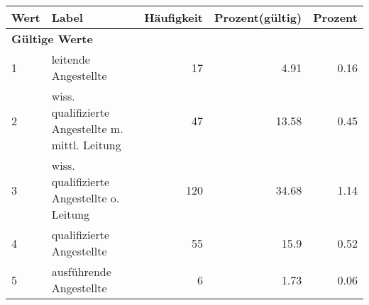      \begin{longtable}{lXrrr}
     \toprule
     \textbf{Wert} & \textbf{Label} & \textbf{Häufigkeit} & \textbf{Prozent(gültig)} & \textbf{Prozent} \\
     \endhead
     \midrule
     \multicolumn{5}{l}{\textbf{Gültige Werte}}\\

     1 &
     \multicolumn{1}{X}{ leitende Angestellte   } &


       \num{17} &
       \num[round-mode=places,round-precision=2]{4,91} &
         \num[round-mode=places,round-precision=2]{0,16} \\

     2 &
     \multicolumn{1}{X}{ wiss. qualifizierte Angestellte m. mittl. Leitung   } &


       \num{47} &
       \num[round-mode=places,round-precision=2]{13,58} &
         \num[round-mode=places,round-precision=2]{0,45} \\

     3 &
     \multicolumn{1}{X}{ wiss. qualifizierte Angestellte o. Leitung   } &


       \num{120} &
       \num[round-mode=places,round-precision=2]{34,68} &
         \num[round-mode=places,round-precision=2]{1,14} \\

     4 &
     \multicolumn{1}{X}{ qualifizierte Angestellte   } &


       \num{55} &
       \num[round-mode=places,round-precision=2]{15,9} &
         \num[round-mode=places,round-precision=2]{0,52} \\

     5 &
     \multicolumn{1}{X}{ ausführende Angestellte   } &


       \num{6} &
       \num[round-mode=places,round-precision=2]{1,73} &
         \num[round-mode=places,round-precision=2]{0,06} \\


\end{longtable}
